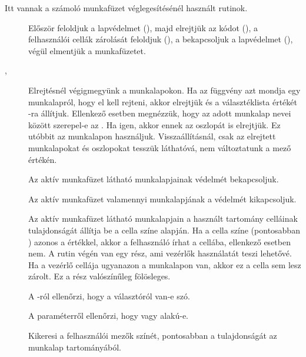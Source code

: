 Itt vannak a számoló munkafüzet véglegesítésénél használt rutinok.
\begin{description}
\item[] Először feloldjuk a lapvédelmet (),
  majd elrejtjük az  kódot  (), a felhasználói cellák
  zárolását feloldjuk (), a bekapcsoljuk a lapvédelmet
  (), végül elmentjük a munkafüzetet.  
\item[, ] Elrejtésnél végigmegyünk
  a munkalapokon. Ha az  
  függvény azt mondja egy munkalapról, hogy el kell rejteni, akkor
  elrejtjük és a  választéklista értékét -ra
  állítjuk. Ellenkező esetben megnézzük, hogy az adott  munkalap
  nevei között szerepel-e az . Ha igen, akkor ennek az oszlopát
  is elrejtjük. Ez utóbbit az  munkalapon használjuk.
  Visszaállításnál, csak az elrejtett munkalapokat és oszlopokat
  tesszük láthatóvá, nem változtatunk a  mező
  értékén. 
\item[] Az aktív munkafüzet látható munkalapjainak védelmét
  bekapcsoljuk.  
\item[] Az aktív munkafüzet valamennyi
  munkalapjának a védelmét kikapcsoljuk.  
\item[] Az aktív
  munkafüzet látható munkalapjain a használt tartomány celláinak
   tulajdonságát állítja be a cella színe alapján. Ha a cella
  színe (pontosabban ) azonos a
   értékkel, 
  akkor a felhasználó írhat a cellába, ellenkező esetben nem.  A
  rutin végén van egy rész, ami  vezérlők használatát teszi
  lehetővé. Ha a  vezérlő  cellája ugyanazon a
  munkalapon van, akkor ez a cella sem lesz  zárolt. Ez a rész
  valószínűleg fölösleges.
\item[] A
   -ról ellenőrzi,  hogy a 
   választóról van-e szó.  
\item[] A 
  paraméterről ellenőrzi, hogy  vagy  
   alakú-e.  
\item[] Kikeresi a felhasználói mezők
  színét, pontosabban a  tulajdonságát az  munkalap
   tartományából.
\end{description}

